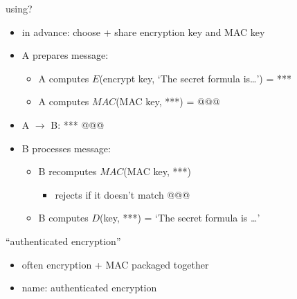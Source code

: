 \begin{frame}{using?}
    \begin{itemize}
    \item in advance: choose + share encryption key and MAC key
    \vspace{.5cm}
    \item A prepares message:
    \begin{itemize}
    \item A computes $E$(encrypt key, `The secret formula is\ldots') = ***
    \item A computes $MAC$(MAC key, ***) = @@@
    \end{itemize}
    \item A $\rightarrow$ B: *** @@@
    \item B processes message:
    \begin{itemize}
        \item B recomputes $MAC$(MAC key, ***)
            \begin{itemize}
            \item rejects if it doesn't match @@@
            \end{itemize}
        \item B computes $D$(key, ***) = `The secret formula is \ldots'
    \end{itemize}
    \end{itemize}
\end{frame}

\begin{frame}{``authenticated encryption''}
    \begin{itemize}
    \item often encryption + MAC packaged together 
    \item name: authenticated encryption
    \end{itemize}
\end{frame}
